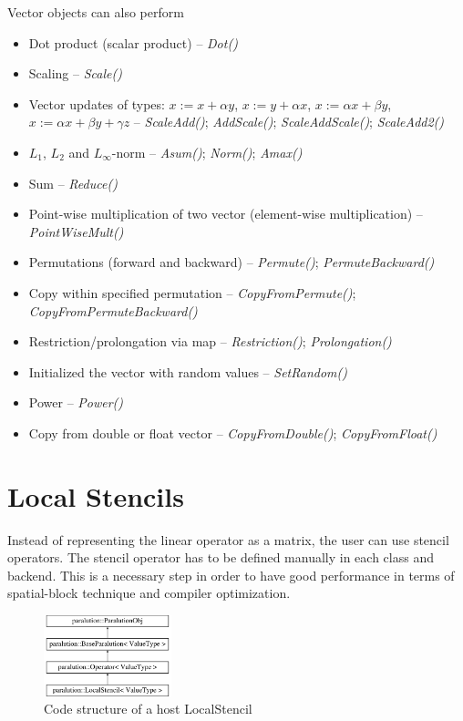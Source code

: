 \vspace{6mm}
Vector objects can also perform  
\begin{itemize}
\itemsep0em
\item Dot product (scalar product) -- \emph{Dot()}
\item Scaling -- \emph{Scale()}
\item Vector updates of types: $x:=x+\alpha y$, $x:=y+\alpha x$, $x:=\alpha x + \beta y$, $x:=\alpha x + \beta y + \gamma z$ -- \emph{ScaleAdd()}; \emph{AddScale()}; \emph{ScaleAddScale()}; \emph{ScaleAdd2()}
\item $L_1$, $L_2$ and $L_{\infty}$-norm -- \emph{Asum()}; \emph{Norm()}; \emph{Amax()} 
\item Sum -- \emph{Reduce()} 
\item Point-wise multiplication of two vector (element-wise multiplication) -- \emph{PointWiseMult()}
\item Permutations (forward and backward) -- \emph{Permute()}; \emph{PermuteBackward()}
\item Copy within specified permutation -- \emph{CopyFromPermute()}; \emph{CopyFromPermuteBackward()}
\item Restriction/prolongation via map -- \emph{Restriction()}; \emph{Prolongation()}
\item Initialized the vector with random values -- \emph{SetRandom()}
\item Power -- \emph{Power()}
\item Copy from double or float vector -- \emph{CopyFromDouble()}; \emph{CopyFromFloat()}
\end{itemize}


\section{Local Stencils}

Instead of representing the linear operator as a matrix, the user can use stencil operators. The stencil operator has to be defined manually in each class and backend. This is a necessary step in order to have good performance in terms of spatial-block technique and compiler optimization.

\begin{figure}[!ht]
\centering
\includegraphics[width=0.33\textwidth]{./fig/body/classparalution_1_1_local_stencil.pdf}
\caption{Code structure of a host LocalStencil}
\end{figure}



